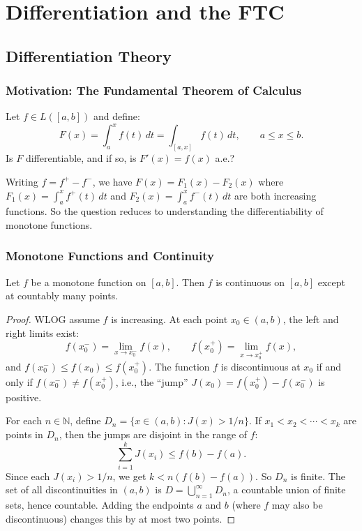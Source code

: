 \documentclass[11pt]{report}
\begin{document}
\newpage

\chapter{Differentiation and the FTC}

\section{Differentiation Theory}

\subsection{Motivation: The Fundamental Theorem of Calculus}

\begin{rembox}
Let $f \in L([a, b])$ and define:
\[
F(x) = \int_a^x f(t)\,dt = \int_{[a,x]} f(t)\,dt, \qquad a \leq x \leq b.
\]
Is $F$ differentiable, and if so, is $F'(x) = f(x)$ a.e.?

Writing $f = f^+ - f^-$, we have $F(x) = F_1(x) - F_2(x)$ where $F_1(x) = \int_a^x f^+(t)\,dt$ and $F_2(x) = \int_a^x f^-(t)\,dt$ are both increasing functions. So the question reduces to understanding the differentiability of monotone functions.
\end{rembox}

\subsection{Monotone Functions and Continuity}

\begin{thmbox}
Let $f$ be a monotone function on $[a, b]$. Then $f$ is continuous on $[a, b]$ except at countably many points.
\end{thmbox}

\begin{proof}
WLOG assume $f$ is increasing. At each point $x_0 \in (a, b)$, the left and right limits exist:
\[
f(x_0^-) = \lim_{x \to x_0^-} f(x), \qquad f(x_0^+) = \lim_{x \to x_0^+} f(x),
\]
and $f(x_0^-) \leq f(x_0) \leq f(x_0^+)$. The function $f$ is discontinuous at $x_0$ if and only if $f(x_0^-) \neq f(x_0^+)$, i.e., the ``jump'' $J(x_0) = f(x_0^+) - f(x_0^-)$ is positive.

For each $n \in \mathbb{N}$, define $D_n = \{x \in (a, b) : J(x) > 1/n\}$. If $x_1 < x_2 < \cdots < x_k$ are points in $D_n$, then the jumps are disjoint in the range of $f$:
\[
\sum_{i=1}^{k} J(x_i) \leq f(b) - f(a).
\]
Since each $J(x_i) > 1/n$, we get $k < n(f(b) - f(a))$. So $D_n$ is finite. The set of all discontinuities in $(a, b)$ is $D = \bigcup_{n=1}^{\infty} D_n$, a countable union of finite sets, hence countable. Adding the endpoints $a$ and $b$ (where $f$ may also be discontinuous) changes this by at most two points.
\end{proof}
\end{document}
